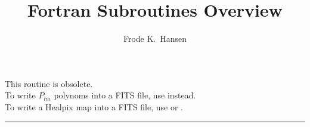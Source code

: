 
\sloppy


\title{\healpix Fortran Subroutines Overview}
 \section[write\_dbintab]{ }
\label{sub:write_dbintab}
\author{Frode K.~Hansen}

\begin{facility}
{This routine is obsolete. \\
To write $P_{lm}$ polynoms into a FITS file,
use 
instead. \\
To write a Healpix map into a FITS file,
use 
or 
.}
{\modFitstools}
\end{facility}


\rule{\hsize}{2mm}

\newpage
